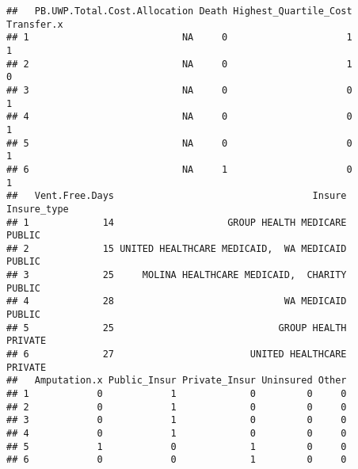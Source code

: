 \documentclass[]{article}
\begin{document}
\begin{verbatim}
##   PB.UWP.Total.Cost.Allocation Death Highest_Quartile_Cost Transfer.x
## 1                           NA     0                     1          1
## 2                           NA     0                     1          0
## 3                           NA     0                     0          1
## 4                           NA     0                     0          1
## 5                           NA     0                     0          1
## 6                           NA     1                     0          1
##   Vent.Free.Days                                   Insure Insure_type
## 1             14                    GROUP HEALTH MEDICARE      PUBLIC
## 2             15 UNITED HEALTHCARE MEDICAID,  WA MEDICAID      PUBLIC
## 3             25     MOLINA HEALTHCARE MEDICAID,  CHARITY      PUBLIC
## 4             28                              WA MEDICAID      PUBLIC
## 5             25                             GROUP HEALTH     PRIVATE
## 6             27                        UNITED HEALTHCARE     PRIVATE
##   Amputation.x Public_Insur Private_Insur Uninsured Other
## 1            0            1             0         0     0
## 2            0            1             0         0     0
## 3            0            1             0         0     0
## 4            0            1             0         0     0
## 5            1            0             1         0     0
## 6            0            0             1         0     0

\end{verbatim}
\end{document}
